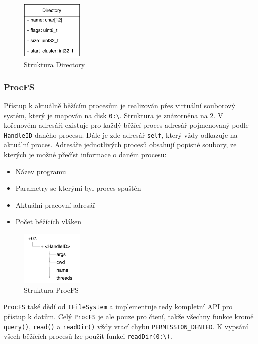 \documentclass[11pt,a4paper]{scrartcl}
\begin{document}
	\begin{figure}[H]
		\centering
		\includegraphics[width=3cm]{dir-c.pdf}
		\caption{Struktura Directory}
		\label{fig:dir-c}
	\end{figure}


	\subsubsection{ProcFS}
	\label{sec:proc-fs}
	Přístup k aktuálně běžícím procesům je realizován přes virtuální souborový systém, který je mapován na disk \verb|0:\|. Struktura je znázorněna na \ref{fig:procfs-struct}. V kořenovém adresáři existuje pro každý běžící proces adresář pojmenovaný podle \verb|HandleID| daného procesu. Dále je zde adresář \verb|self|, který vždy odkazuje na aktuální proces. Adresáře jednotlivých procesů obsahují popisné soubory, ze kterých je možné přečíst informace o daném procesu:
	
	\begin{itemize}
		\item Název programu
		\item Parametry se kterými byl proces spuštěn
		\item Aktuální pracovní adresář
		\item Počet běžících vláken
	\end{itemize}
	
	\begin{figure}[H]
		\centering
		\includegraphics[width=3cm]{procfs-struct.pdf}
		\caption{Struktura ProcFS}
		\label{fig:procfs-struct}
	\end{figure}
	
	\verb|ProcFS| také dědí od \verb|IFileSystem| a implementuje tedy kompletní API pro přístup k datům. Celý \verb|ProcFS| je ale pouze pro čtení, takže všechny funkce kromě \verb|query()|, \verb|read()| a \verb|readDir()| vždy vrací chybu \verb|PERMISSION_DENIED|. K vypsání všech běžících procesů lze použít funkci \verb|readDir(0:\)|.
	
\end{document}
